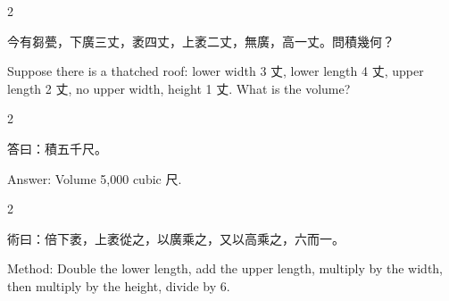 \documentclass[10pt,a4paper]{article}
\begin{document}
\begin{paracol}{2}

\begin{leftcolumn*}
\begin{problembi}[\textbf{問} · 芻甍]
今有芻甍，下廣三丈，袤四丈，上袤二丈，無廣，高一丈。問積幾何？
\end{problembi}
\end{leftcolumn*}

\begin{rightcolumn*}
\begin{problembi}
Suppose there is a thatched roof: lower width 3 丈, lower length 4 丈, upper length 2 丈, no upper width, height 1 丈. What is the volume?
\end{problembi}
\end{rightcolumn*}

\end{paracol}

\begin{paracol}{2}

\begin{leftcolumn*}
\begin{answerbi}[\textbf{答}]
答曰：積五千尺。
\end{answerbi}
\end{leftcolumn*}

\begin{rightcolumn*}
\begin{answerbi}
Answer: Volume 5,000 cubic 尺.
\end{answerbi}
\end{rightcolumn*}

\end{paracol}

\begin{paracol}{2}

\begin{leftcolumn*}
\begin{methodbi}[\textbf{術}]
術曰：倍下袤，上袤從之，以廣乘之，又以高乘之，六而一。
\end{methodbi}
\end{leftcolumn*}

\begin{rightcolumn*}
\begin{methodbi}
Method: Double the lower length, add the upper length, multiply by the width, then multiply by the height, divide by 6.
\end{methodbi}
\end{rightcolumn*}

\end{paracol}
\end{document}
